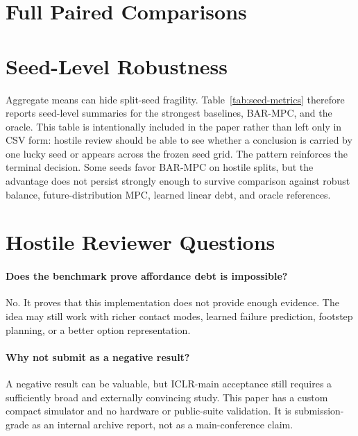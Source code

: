 \documentclass{article}
\newcommand{\method}{\textsc{BAR-MPC}}
\begin{document}


\clearpage
\section{Full Paired Comparisons}



\clearpage
\section{Seed-Level Robustness}

Aggregate means can hide split-seed fragility. Table~\ref{tab:seed-metrics} therefore reports seed-level summaries for the strongest baselines, \method{}, and the oracle. This table is intentionally included in the paper rather than left only in CSV form: hostile review should be able to see whether a conclusion is carried by one lucky seed or appears across the frozen seed grid. The pattern reinforces the terminal decision. Some seeds favor \method{} on hostile splits, but the advantage does not persist strongly enough to survive comparison against robust balance, future-distribution MPC, learned linear debt, and oracle references.



\clearpage
\section{Hostile Reviewer Questions}

\paragraph{Does the benchmark prove affordance debt is impossible?}
No. It proves that this implementation does not provide enough evidence. The idea may still work with richer contact modes, learned failure prediction, footstep planning, or a better option representation.

\paragraph{Why not submit as a negative result?}
A negative result can be valuable, but ICLR-main acceptance still requires a sufficiently broad and externally convincing study. This paper has a custom compact simulator and no hardware or public-suite validation. It is submission-grade as an internal archive report, not as a main-conference claim.
\end{document}
